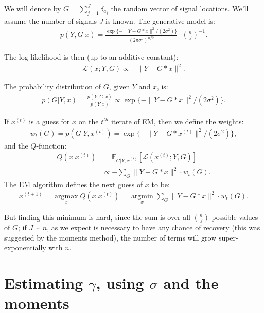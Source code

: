 \documentclass{article}
\theoremstyle{thm}
\theoremstyle{definition}
\newcommand{\LL}{\mathcal{L}}
\newcommand{\E}{\mathbb{E}}
\newcommand{\1}{\mathbf{1}}
\begin{document}
We will denote by $G=\sum_{j=1}^J \delta_{a_j}$ the random vector of signal locations. We'll assume the number of signals $J$ is known. The generative model is:
%
\begin{align}
%
    p(Y , G | x)
    = \frac{\exp\{-\| Y - G \ast x \|^2 / (2\sigma^2)\}}{(2\pi\sigma^2)^{n/2}} 
        \cdot {n \choose J}^{-1}.
%
\end{align}

The log-likelihood is then (up to an additive constant):
%
\begin{align}
%
    \LL(x; Y, G) \propto - \|Y - G\ast x\|^2.
%
\end{align}

The probability distribution of $G$, given $Y$ and $x$, is:
%
\begin{align}
%
    p(G | Y, x) = \frac{ p(Y , G | x) }{ p(Y | x) }
    \propto \exp\{-\| Y - G \ast x \|^2 / (2\sigma^2)\}.
%
\end{align}

If $x^{(t)}$ is a guess for $x$ on the $t^{th}$ iterate of EM, then we define the weights:
%
\begin{align}
%
    w_t(G) = p(G | Y,x^{(t)}) = \exp\{-\| Y - G \ast x^{(t)} \|^2 / (2\sigma^2)\},
%
\end{align}
%
and the $Q$-function:
%
\begin{align}
%
    Q(x|x^{(t)}) 
    &= \E_{G|Y,x^{(t)}} \left[ \LL(x^{(t)};Y,G) \right]
        \nonumber \\
    &\propto - \sum_{G} \|Y - G\ast x\|^2 \cdot w_t(G).
%
\end{align}
%
The EM algorithm defines the next guess of $x$ to be:
%
\begin{align}
%
    x^{(t+1)} = \operatorname*{\arg\max}_x Q(x|x^{(t)})
        = \operatorname*{\arg\min}_x \sum_{G} \|Y - G\ast x\|^2 \cdot w_t(G).
%
\end{align}

But finding this minimum is hard, since the sum is over all ${n}\choose{J}$ possible values of $G$; if $J \sim n$, as we expect is necessary to have any chance of recovery (this was suggested by the moments method), the number of terms will grow super-exponentially with $n$.

%
%
%

\section{Estimating $\gamma$, using $\sigma$ and the moments}
\end{document}
